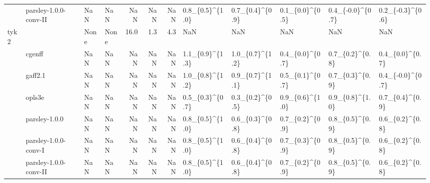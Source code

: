 \begin{tabular}{llllrrrlllll}
     & parsley-1.0.0-conv-II &         NaN &                 NaN &         NaN &      NaN &            NaN &  0.8\_\{0.5\}\textasciicircum \{1.0\} &  0.7\_\{0.4\}\textasciicircum \{0.9\} &  0.1\_\{0.0\}\textasciicircum \{0.5\} &   0.4\_\{-0.0\}\textasciicircum \{0.7\} &  0.2\_\{-0.3\}\textasciicircum \{0.6\} \\
tyk2 &                       &        None &                None &        16.0 &      1.3 &            4.3 &              NaN &              NaN &              NaN &                NaN &               NaN \\
     & cgenff &         NaN &                 NaN &         NaN &      NaN &            NaN &  1.1\_\{0.9\}\textasciicircum \{1.3\} &  1.0\_\{0.7\}\textasciicircum \{1.2\} &  0.4\_\{0.0\}\textasciicircum \{0.7\} &    0.7\_\{0.2\}\textasciicircum \{0.8\} &   0.4\_\{0.0\}\textasciicircum \{0.7\} \\
     & gaff2.1 &         NaN &                 NaN &         NaN &      NaN &            NaN &  1.0\_\{0.8\}\textasciicircum \{1.2\} &  0.9\_\{0.7\}\textasciicircum \{1.1\} &  0.5\_\{0.1\}\textasciicircum \{0.7\} &    0.7\_\{0.3\}\textasciicircum \{0.9\} &  0.4\_\{-0.0\}\textasciicircum \{0.7\} \\
     & opls3e &         NaN &                 NaN &         NaN &      NaN &            NaN &  0.5\_\{0.3\}\textasciicircum \{0.7\} &  0.3\_\{0.2\}\textasciicircum \{0.5\} &  0.9\_\{0.6\}\textasciicircum \{1.0\} &    0.9\_\{0.8\}\textasciicircum \{1.0\} &   0.7\_\{0.4\}\textasciicircum \{0.9\} \\
     & parsley-1.0.0 &         NaN &                 NaN &         NaN &      NaN &            NaN &  0.8\_\{0.5\}\textasciicircum \{1.0\} &  0.6\_\{0.3\}\textasciicircum \{0.8\} &  0.7\_\{0.2\}\textasciicircum \{0.9\} &    0.8\_\{0.5\}\textasciicircum \{0.9\} &   0.6\_\{0.2\}\textasciicircum \{0.8\} \\
     & parsley-1.0.0-conv-I &         NaN &                 NaN &         NaN &      NaN &            NaN &  0.8\_\{0.5\}\textasciicircum \{1.0\} &  0.6\_\{0.4\}\textasciicircum \{0.8\} &  0.7\_\{0.3\}\textasciicircum \{0.9\} &    0.8\_\{0.5\}\textasciicircum \{0.9\} &   0.6\_\{0.2\}\textasciicircum \{0.8\} \\
     & parsley-1.0.0-conv-II &         NaN &                 NaN &         NaN &      NaN &            NaN &  0.8\_\{0.5\}\textasciicircum \{1.0\} &  0.6\_\{0.4\}\textasciicircum \{0.8\} &  0.7\_\{0.2\}\textasciicircum \{0.9\} &    0.8\_\{0.5\}\textasciicircum \{0.9\} &   0.6\_\{0.2\}\textasciicircum \{0.8\} \\
\bottomrule
\end{tabular}
